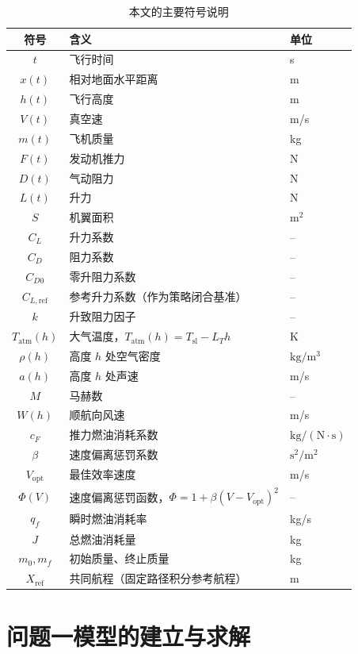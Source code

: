 \documentclass[withoutpreface,bwprint]{cumcmthesis}
\begin{document}
\begin{table}[htpb]
\centering
\caption{本文的主要符号说明}\label{tab:symbols}
\begin{tabular}{cll}\toprule
符号 & 含义 & 单位 \\
\midrule
$t$ & 飞行时间 & s \\
$x(t)$ & 相对地面水平距离 & m \\
$h(t)$ & 飞行高度 & m \\
$V(t)$ & 真空速 & m/s \\
$m(t)$ & 飞机质量 & kg \\
$F(t)$ & 发动机推力 & N \\
$D(t)$ & 气动阻力 & N \\
$L(t)$ & 升力 & N \\
$S$ & 机翼面积 & $\mathrm{m^2}$ \\
$C_L$ & 升力系数 & -- \\
$C_D$ & 阻力系数 & -- \\
$C_{D0}$ & 零升阻力系数 & -- \\
$C_{L,\mathrm{ref}}$ & 参考升力系数（作为策略闭合基准） & -- \\
$k$ & 升致阻力因子 & -- \\
$T_{\mathrm{atm}}(h)$ & 大气温度，$T_{\mathrm{atm}}(h)=T_{\mathrm{sl}}-L_T h$ & K \\
$\rho(h)$ & 高度 $h$ 处空气密度 & $\mathrm{kg/m^3}$ \\
$a(h)$ & 高度 $h$ 处声速 & m/s \\
$M$ & 马赫数 & -- \\
$W(h)$ & 顺航向风速 & m/s \\
$c_F$ & 推力燃油消耗系数 & $\mathrm{kg/(N\cdot s)}$ \\
$\beta$ & 速度偏离惩罚系数 & $\mathrm{s^2/m^2}$ \\
$V_{\mathrm{opt}}$ & 最佳效率速度 & m/s \\
$\Phi(V)$ & 速度偏离惩罚函数，$\Phi=1+\beta(V-V_{\mathrm{opt}})^2$ & -- \\
$q_f$ & 瞬时燃油消耗率 & kg/s \\
$J$ & 总燃油消耗量 & kg \\
$m_0,m_f$ & 初始质量、终止质量 & kg \\
$X_{\mathrm{ref}}$ & 共同航程（固定路径积分参考航程） & m \\

\bottomrule
\end{tabular}
\end{table}

\section{问题一模型的建立与求解}
\end{document}
